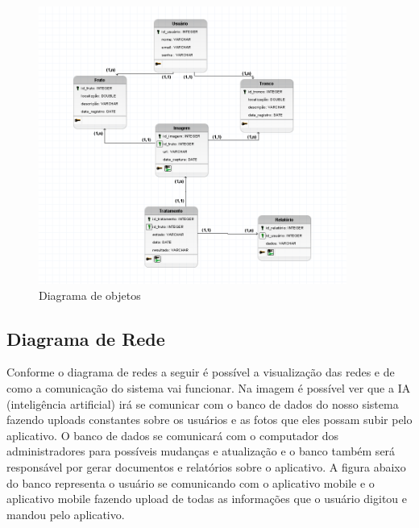 \documentclass[
  a4paper,%
  12pt,%
  english,%
  brazilian,%
]{article}
\begin{document}
        \begin{figure}[h]
\centering
\caption{Diagrama de objetos}%
\label{fig:diagrama-logico}
 \includegraphics[width=0.9\textwidth]{Logos/logico.png}
\end{figure}

\subsection*{Diagrama de Rede}

    Conforme o diagrama de redes a seguir é possível a visualização das redes e de como a comunicação do sistema vai funcionar. Na imagem é possível ver que a IA (inteligência artificial) irá se comunicar com o banco de dados do nosso sistema fazendo uploads constantes sobre os usuários e as fotos que eles possam subir pelo aplicativo. O banco de dados se comunicará com o computador dos administradores para possíveis mudanças e atualização e o banco também será responsável por gerar documentos e relatórios sobre o aplicativo. A figura abaixo do banco representa o usuário se comunicando com o aplicativo mobile e o aplicativo mobile fazendo upload de todas as informações que o usuário digitou e mandou pelo aplicativo.
\end{document}
